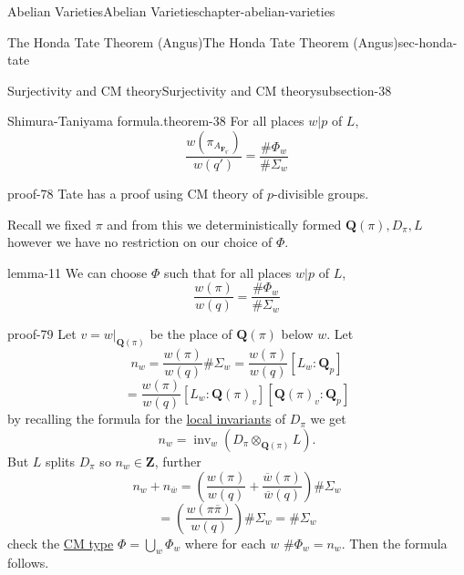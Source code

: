 \documentclass[oneside,10pt,]{book}
\numberwithin{equation}{section}
\newcommand{\ZZ}{\mathbf{Z}}
\newcommand{\QQ}{\mathbf{Q}}
\newcommand{\FF}{\mathbf{F}}
\begin{document}
\begin{chapterptx}{Abelian Varieties}{}{Abelian Varieties}{}{}{chapter-abelian-varieties}
\begin{sectionptx}{The Honda Tate Theorem (Angus)}{}{The Honda Tate Theorem (Angus)}{}{}{sec-honda-tate}
\begin{subsectionptx}{Surjectivity and CM theory}{}{Surjectivity and CM theory}{}{}{subsection-38}
\begin{equation*}
\end{equation*}
%
\begin{theorem}{Shimura-Taniyama formula.}{}{theorem-38}%
\hypertarget{p-450}{}%
For all places \(w|p\) of \(L\),%
\begin{equation*}
\frac{w(\pi_{A_{\FF_{q'}}})}{w(q')} = \frac{\#\Phi_w}{\#\Sigma_w}
\end{equation*}
%
\end{theorem}
\begin{proofptx}{}{proof-78}
\hypertarget{p-451}{}%
Tate has a proof using CM theory of \(p\)-divisible groups.%
\end{proofptx}
\hypertarget{p-452}{}%
Recall we fixed \(\pi\) and from this we deterministically formed \(\QQ(\pi), D_{\pi}, L\) however we have no restriction on our choice of \(\Phi\).%
\begin{lemma}{}{}{lemma-11}%
\hypertarget{p-453}{}%
We can choose \(\Phi\) such that for all places \(w|p\) of \(L\),%
\begin{equation*}
\frac{w(\pi)}{w(q)} = \frac{\#\Phi_w}{\#\Sigma_w}
\end{equation*}
%
\end{lemma}
\begin{proofptx}{}{proof-79}
\hypertarget{p-454}{}%
Let \(v = w|_{\QQ(\pi)}\) be the place of \(\QQ(\pi)\) below \(w\). Let%
\begin{equation*}
n_w = \frac{w(\pi)}{w(q)}\#\Sigma_w = \frac{w(\pi)}{w(q)}[L_w :\QQ_p]
\end{equation*}
%
\begin{equation*}
= \frac{w(\pi)}{w(q)}[L_w :\QQ(\pi)_v ][ \QQ(\pi)_v:\QQ_p]
\end{equation*}
by recalling the formula for the \hyperref[def-brauer-gp]{local invariants} of \(D_\pi\) we get%
\begin{equation*}
n_w = \operatorname{inv}_w(D_\pi\otimes_{\QQ(\pi)} L)\text{.}
\end{equation*}
But \(L\) splits \(D_\pi\) so \(n_w \in \ZZ\), further%
\begin{equation*}
n_w + n_{\overline w} = \left( \frac{w(\pi)}{w(q)}  + \frac{\overline w(\pi)}{\overline w(q)} \right) \#\Sigma_w
\end{equation*}
%
\begin{equation*}
= \left( \frac{w(\pi\overline \pi)}{w(q)} \right) \#\Sigma_w = \#\Sigma_w
\end{equation*}
check the \hyperref[def-cm-type]{CM type} \(\Phi = \bigcup_w \Phi_w\) where for each \(w\) \(\# \Phi_w = n_w\). Then the formula follows.%

\end{proofptx}
\end{subsectionptx}
\end{sectionptx}
\end{chapterptx}
\end{document}
